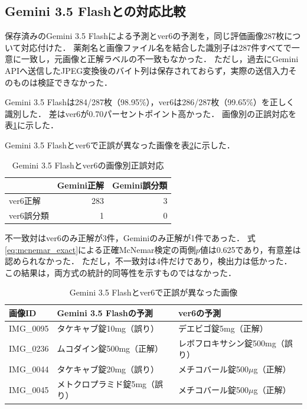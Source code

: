 \documentclass[uplatex,dvipdfmx]{jsarticle}
\begin{document}
\subsection{Gemini 3.5 Flashとの対応比較}\label{sec:gemini_compare}

保存済みのGemini 3.5 Flashによる予測とver6の予測を，同じ評価画像287枚について対応付けた．
薬剤名と画像ファイル名を結合した識別子は287件すべてで一意に一致し，元画像と正解ラベルの不一致もなかった．
ただし，過去にGemini APIへ送信したJPEG変換後のバイト列は保存されておらず，実際の送信入力そのものは検証できなかった．

Gemini 3.5 Flashは284/287枚（98.95\%），ver6は286/287枚（99.65\%）を正しく識別した．
差はver6が0.70パーセントポイント高かった．
画像別の正誤対応を表\ref{tab:paired_gemini_ver6}に示した．

Gemini 3.5 Flashとver6で正誤が異なった画像を表\ref{tab:discordant_gemini_ver6}に示した．
\begin{table}[H]
  \centering
  \caption{Gemini 3.5 Flashとver6の画像別正誤対応}
  \label{tab:paired_gemini_ver6}
  \small
  \begin{tabular}{|l|r|r|}
    \hline
     & Gemini正解 & Gemini誤分類 \\ \hline
    ver6正解 & 283 & 3 \\ \hline
    ver6誤分類 & 1 & 0 \\ \hline
  \end{tabular}
\end{table}

不一致対はver6のみ正解が3件，Geminiのみ正解が1件であった．
式\eqref{eq:mcnemar_exact}による正確McNemar検定の両側$p$値は0.625であり，有意差は認められなかった．
ただし，不一致対は4件だけであり，検出力は低かった．
この結果は，両方式の統計的同等性を示すものではなかった．

\begin{table}[H]
  \centering
  \caption{Gemini 3.5 Flashとver6で正誤が異なった画像}
  \label{tab:discordant_gemini_ver6}
  \scriptsize
  \begin{tabular}{|p{1.8cm}|p{4.2cm}|p{4.2cm}|}
    \hline
    画像ID & Gemini 3.5 Flashの予測 & ver6の予測 \\ \hline
    IMG\_0095 & タケキャブ錠10mg（誤り） & デエビゴ錠5mg（正解） \\ \hline
    IMG\_0236 & ムコダイン錠500mg（正解） & レボフロキサシン錠500mg（誤り） \\ \hline
    IMG\_0044 & タケキャブ錠20mg（誤り） & メチコバール錠500$\mu$g（正解） \\ \hline
    IMG\_0045 & メトクロプラミド錠5mg（誤り） & メチコバール錠500$\mu$g（正解） \\ \hline
  \end{tabular}
\end{table}
\end{document}
